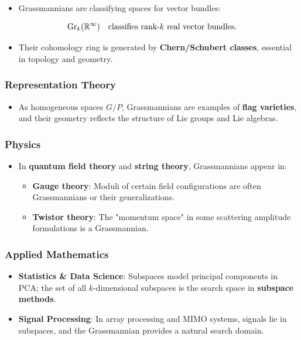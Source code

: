 \documentclass{amsart}
\let\originalmathbb\mathbb
\renewcommand{\mathbb}[1]{%
    \ifstrequal{#1}{1}{\mathbbm{#1}}{\originalmathbb{#1}}%
}
\theoremstyle{plain}
\theoremstyle{definition}
\theoremstyle{remark}
\begin{document}
\begin{itemize}
	\item Grassmannians are classifying spaces for vector bundles:
\end{itemize}
\[
\mathrm{Gr}_k(\mathbb{R}^\infty) \quad\text{classifies rank-\(k\) real vector bundles}.
\]
\begin{itemize}
	\item Their cohomology ring is generated by \textbf{Chern/Schubert classes}, essential in topology and geometry.
\end{itemize}

\subsubsection{\textbf{Representation Theory}}

\begin{itemize}
	\item As homogeneous spaces $G/P$, Grassmannians are examples of \textbf{flag varieties}, and their geometry reflects the structure of Lie groups and Lie algebras.
\end{itemize}

\subsubsection{\textbf{Physics}}

\begin{itemize}
	\item In \textbf{quantum field theory} and \textbf{string theory}, Grassmannians appear in:
	\begin{itemize}
		\item \textbf{Gauge theory}: Moduli of certain field configurations are often Grassmannians or their generalizations.
		\item \textbf{Twistor theory}: The "momentum space" in some scattering amplitude formulations is a Grassmannian.
	\end{itemize}
\end{itemize}

\subsubsection{\textbf{Applied Mathematics}}

\begin{itemize}
	\item \textbf{Statistics \& Data Science}: Subspaces model principal components in PCA; the set of all $k$-dimensional subspaces is the search space in \textbf{subspace methods}.
	\item \textbf{Signal Processing}: In array processing and MIMO systems, signals lie in subspaces, and the Grassmannian provides a natural search domain.
\end{itemize}
\end{document}
